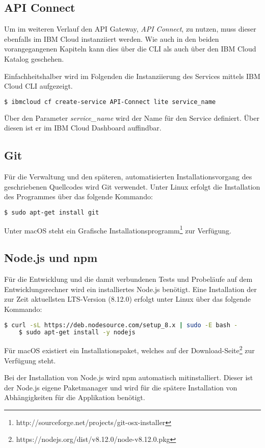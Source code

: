 \subsection{API Connect}
\label{subsec:apiconnect}
Um im weiteren Verlauf den API Gateway, \textit{API Connect}, zu nutzen, muss dieser ebenfalls im IBM Cloud
instanziiert werden. Wie auch in den beiden vorangegangenen Kapiteln kann dies über die CLI als auch über den IBM Cloud
Katalog geschehen.

Einfachheitshalber wird im Folgenden die Instanziierung des Services mittels IBM Cloud CLI aufgezeigt.

\begin{lstlisting}[language=bash, caption=Instanziierung von API Connect, label=Instanziierung von API Connect]
$ ibmcloud cf create-service API-Connect lite service_name
\end{lstlisting}

Über den Parameter \textit{service\_name} wird der Name für den Service definiert. Über diesen ist er im IBM Cloud
Dashboard auffindbar.

\subsection{Git}
Für die Verwaltung und den späteren, automatisierten Installationsvorgang des geschriebenen Quellcodes wird Git verwendet.
Unter Linux erfolgt die Installation des Programmes über das folgende Kommando:

\begin{lstlisting}[language=bash, caption=Installation von Git, label=Installation von Git]
    $ sudo apt-get install git
\end{lstlisting}

Unter macOS steht ein Grafische Installationsprogramm\footnote{http://sourceforge.net/projects/git-osx-installer} zur
Verfügung.

\subsection{Node.js und npm}
Für die Entwicklung und die damit verbundenen Tests und Probeläufe auf dem Entwicklungsrechner wird ein installiertes
Node.js benötigt. Eine Installation der zur Zeit aktuellsten LTS-Version (8.12.0) erfolgt unter Linux über das folgende
Kommando:

\begin{lstlisting}[language=bash, caption=Installation von Node.js, label=Installation von Node.js]
    $ curl -sL https://deb.nodesource.com/setup_8.x | sudo -E bash -
    $ sudo apt-get install -y nodejs
\end{lstlisting}

Für macOS existiert ein Installationspaket, welches auf der Download-Seite\footnote{https://nodejs.org/dist/v8.12.0/node-v8.12.0.pkg}
zur Verfügung steht.

Bei der Installation von Node.js wird npm automatisch mitinstalliert. Dieser ist der Node.js eigene Paketmanager und wird
für die spätere Installation von Abhängigkeiten für die Applikation benötigt.